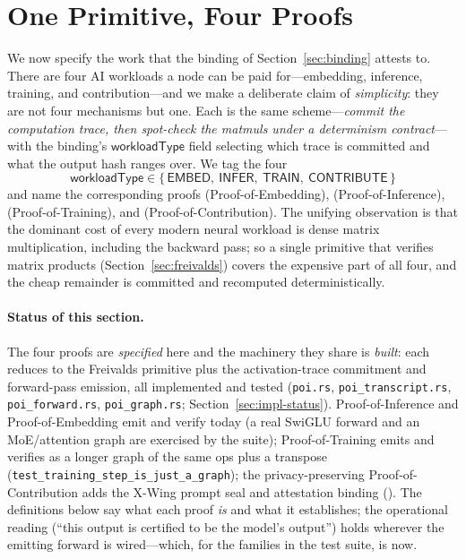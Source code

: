 \section{One Primitive, Four Proofs}
\label{sec:four-proofs}

We now specify the work that the binding of Section~\ref{sec:binding} attests to.
There are four AI workloads a node can be paid for---embedding, inference,
training, and contribution---and we make a deliberate claim of \emph{simplicity}:
they are not four mechanisms but one. Each is the same scheme---\emph{commit the
computation trace, then spot-check the matmuls under a determinism contract}---with
the binding's $\mathsf{workloadType}$ field selecting which trace is committed and
what the output hash ranges over. We tag the four
\begin{equation}
\mathsf{workloadType} \in \{\,\mathsf{EMBED},\ \mathsf{INFER},\ \mathsf{TRAIN},\ \mathsf{CONTRIBUTE}\,\}
\end{equation}
and name the corresponding proofs \PoE{} (Proof-of-Embedding), \PoI{}
(Proof-of-Inference), \PoT{} (Proof-of-Training), and \PoC{}
(Proof-of-Contribution). The unifying observation is that the dominant cost of
every modern neural workload is dense matrix multiplication, including the backward
pass; so a single primitive that verifies matrix products
(Section~\ref{sec:freivalds}) covers the expensive part of all four, and the cheap
remainder is committed and recomputed deterministically.

\paragraph{Status of this section.} The four proofs are \emph{specified} here and the
machinery they share is \emph{built}: each reduces to the Freivalds primitive plus the
activation-trace commitment and forward-pass emission, all implemented and tested
(\texttt{poi.rs}, \texttt{poi\_transcript.rs}, \texttt{poi\_forward.rs},
\texttt{poi\_graph.rs}; Section~\ref{sec:impl-status}). Proof-of-Inference and
Proof-of-Embedding emit and verify today (a real SwiGLU forward and an MoE/attention graph
are exercised by the suite); Proof-of-Training emits and verifies as a longer graph of the
same ops plus a transpose (\texttt{test\_training\_step\_is\_just\_a\_graph}); the
privacy-preserving Proof-of-Contribution adds the X-Wing prompt seal and attestation
binding (\cite{poiemission}). The definitions below say what each proof \emph{is} and what
it establishes; the operational reading (``this output is certified to be the model's
output'') holds wherever the emitting forward is wired---which, for the families in the
test suite, is now.

